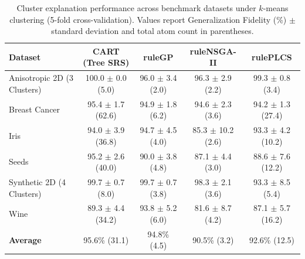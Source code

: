 \begin{table}[t]
\centering
\caption{Cluster explanation performance across benchmark datasets under $k$-means clustering (5-fold cross-validation). Values report Generalization Fidelity (\%) $\pm$ standard deviation and total atom count in parentheses.}
\label{tab:cluster_explanation_benchmark}
\begin{tabular}{lcccc}
\toprule
\textbf{Dataset} & \textbf{CART (Tree SRS)} & \textbf{ruleGP} & \textbf{ruleNSGA-II} & \textbf{rulePLCS} \\
\midrule
Anisotropic 2D (3 Clusters) & 100.0 $\pm$ 0.0 (5.0) & 96.0 $\pm$ 3.4 (2.0) & 96.3 $\pm$ 2.9 (2.2) & 99.3 $\pm$ 0.8 (3.4) \\
Breast Cancer & 95.4 $\pm$ 1.7 (62.6) & 94.9 $\pm$ 1.8 (6.2) & 94.6 $\pm$ 2.3 (3.6) & 94.2 $\pm$ 1.3 (27.4) \\
Iris & 94.0 $\pm$ 3.9 (36.8) & 94.7 $\pm$ 4.5 (4.0) & 85.3 $\pm$ 10.2 (2.6) & 93.3 $\pm$ 4.2 (10.2) \\
Seeds & 95.2 $\pm$ 2.6 (40.0) & 90.0 $\pm$ 3.8 (4.8) & 87.1 $\pm$ 4.4 (3.0) & 88.6 $\pm$ 7.6 (12.2) \\
Synthetic 2D (4 Clusters) & 99.7 $\pm$ 0.7 (8.0) & 99.7 $\pm$ 0.7 (3.8) & 98.3 $\pm$ 2.1 (3.6) & 93.3 $\pm$ 8.5 (5.4) \\
Wine & 89.3 $\pm$ 4.4 (34.2) & 93.8 $\pm$ 5.2 (6.0) & 81.6 $\pm$ 8.7 (4.2) & 87.1 $\pm$ 5.7 (16.2) \\
\midrule
\textbf{Average} & 95.6\% (31.1) & 94.8\% (4.5) & 90.5\% (3.2) & 92.6\% (12.5) \\
\bottomrule
\end{tabular}
\end{table}
